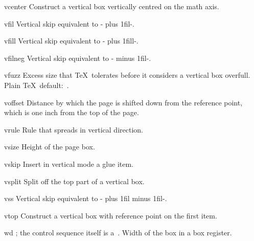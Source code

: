 \item vcenter\lb{}\rb
      Construct a  vertical box vertically centred on the math axis.

\item vfil
      Vertical skip equivalent to \ver-\vskip 0cm plus 1fil-.

\item vfill
      Vertical skip equivalent to \ver-\vskip 0cm plus 1fill-.

\item vfilneg
      Vertical skip equivalent to \ver-\vskip 0cm minus 1fil-.

\item vfuzz
      Excess size that \TeX\ tolerates before it considers  
      a vertical box overfull.
      Plain \TeX\ default:~\n{0.1pt}.

\item voffset
      Distance by which the page is shifted down from the reference point,
      which is one inch from the top of the page.

\item vrule
      Rule that spreads in vertical direction.

\item vsize
      Height of the page box.

\item vskip
      Insert in vertical mode a glue item.

\item vsplit
      Split off the top part of a vertical box. 

\item vss
      Vertical skip equivalent to \ver-\vskip 0cm plus 1fil minus 1fil-.

\item vtop\lb{}\rb
      Construct a vertical box with reference point on the first item. 

\item wd
      ; the control sequence itself
      is a~.
      Width of the box in a box register.

